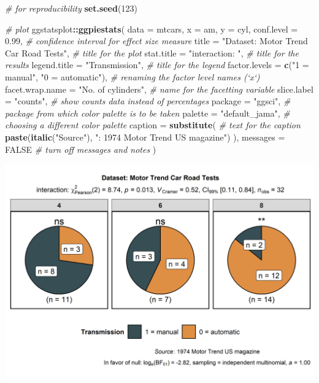 \documentclass[]{article}
\newenvironment{Shaded}{\begin{snugshade}}{\end{snugshade}}
\newcommand{\CommentTok}[1]{\textcolor[rgb]{0.56,0.35,0.01}{\textit{#1}}}
\newcommand{\DataTypeTok}[1]{\textcolor[rgb]{0.13,0.29,0.53}{#1}}
\newcommand{\DecValTok}[1]{\textcolor[rgb]{0.00,0.00,0.81}{#1}}
\newcommand{\FloatTok}[1]{\textcolor[rgb]{0.00,0.00,0.81}{#1}}
\newcommand{\KeywordTok}[1]{\textcolor[rgb]{0.13,0.29,0.53}{\textbf{#1}}}
\newcommand{\NormalTok}[1]{#1}
\newcommand{\OperatorTok}[1]{\textcolor[rgb]{0.81,0.36,0.00}{\textbf{#1}}}
\newcommand{\OtherTok}[1]{\textcolor[rgb]{0.56,0.35,0.01}{#1}}
\newcommand{\StringTok}[1]{\textcolor[rgb]{0.31,0.60,0.02}{#1}}
\begin{document}
\begin{Shaded}
\begin{Highlighting}[]
\CommentTok{# for reproducibility}
\KeywordTok{set.seed}\NormalTok{(}\DecValTok{123}\NormalTok{)}

\CommentTok{# plot}
\NormalTok{ggstatsplot}\OperatorTok{::}\KeywordTok{ggpiestats}\NormalTok{(}
  \DataTypeTok{data =}\NormalTok{ mtcars,}
  \DataTypeTok{x =}\NormalTok{ am,}
  \DataTypeTok{y =}\NormalTok{ cyl,}
  \DataTypeTok{conf.level =} \FloatTok{0.99}\NormalTok{, }\CommentTok{# confidence interval for effect size measure}
  \DataTypeTok{title =} \StringTok{"Dataset: Motor Trend Car Road Tests"}\NormalTok{, }\CommentTok{# title for the plot}
  \DataTypeTok{stat.title =} \StringTok{"interaction: "}\NormalTok{, }\CommentTok{# title for the results}
  \DataTypeTok{legend.title =} \StringTok{"Transmission"}\NormalTok{, }\CommentTok{# title for the legend}
  \DataTypeTok{factor.levels =} \KeywordTok{c}\NormalTok{(}\StringTok{"1 = manual"}\NormalTok{, }\StringTok{"0 = automatic"}\NormalTok{), }\CommentTok{# renaming the factor level names (`x`)}
  \DataTypeTok{facet.wrap.name =} \StringTok{"No. of cylinders"}\NormalTok{, }\CommentTok{# name for the facetting variable}
  \DataTypeTok{slice.label =} \StringTok{"counts"}\NormalTok{, }\CommentTok{# show counts data instead of percentages}
  \DataTypeTok{package =} \StringTok{"ggsci"}\NormalTok{, }\CommentTok{# package from which color palette is to be taken}
  \DataTypeTok{palette =} \StringTok{"default_jama"}\NormalTok{, }\CommentTok{# choosing a different color palette}
  \DataTypeTok{caption =} \KeywordTok{substitute}\NormalTok{( }\CommentTok{# text for the caption}
    \KeywordTok{paste}\NormalTok{(}\KeywordTok{italic}\NormalTok{(}\StringTok{"Source"}\NormalTok{), }\StringTok{": 1974 Motor Trend US magazine"}\NormalTok{)}
\NormalTok{  ),}
  \DataTypeTok{messages =} \OtherTok{FALSE} \CommentTok{# turn off messages and notes}
\NormalTok{)}
\end{Highlighting}
\end{Shaded}

\includegraphics[width=1\linewidth]{./figures/paper-ggpiestats2-1}
\end{document}
